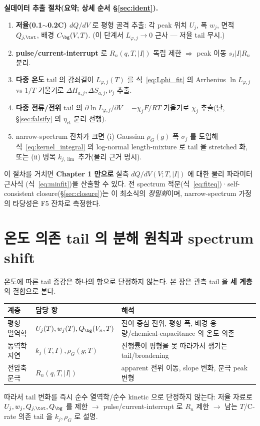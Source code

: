 \textbf{실데이터 추출 절차(요약; 상세 순서 \S\ref{sec:ident}).}
\begin{enumerate}[label=\textbf{F\arabic*.},leftmargin=2.4em]
\item \textbf{저율(0.1$\sim$0.2C) $dQ/dV$} 로 평형 골격 추출: 각 peak 위치 $U_j$, 폭 $w_j$, 면적
  $Q_{j,\tot}$, 배경 $C_\bg(V,T)$. (이 단계서 $L_{\varphi,j}\!\to\!0$ 근사 — 저율 tail 무시.)
\item \textbf{pulse/current-interrupt} 로 $R_n(q,T,|I|)$ 독립 제한 $\Rightarrow$ peak 이동
  $s_I|I|R_n$ 분리.
\item \textbf{다중 온도} tail 의 감쇠길이 $L_{\varphi,j}(T)$ 를 식~\eqref{eq:Lphi_fit} 의 Arrhenius
  $\ln L_{\varphi,j}$ vs $1/T$ 기울기로 $\Delta H_{a,j},\Delta S_{a,j},\nu_j$ 추출.
\item \textbf{다중 전류/전위} tail 의 $\partial\ln L_{\varphi,j}/\partial V=-\chi_j F/RT$ 기울기로 $\chi_j$
  추출(단, \S\ref{sec:falsify} 의 $\eta_\mathrm{ct}$ 분리 선행).
\item narrow-spectrum 잔차가 크면 (i) Gaussian $\rho_G(g)$ 폭 $\sigma_j$ 를 도입해 식~\eqref{eq:kernel_integral}
  의 log-normal length-mixture 로 tail 을 stretched 화, 또는 (ii) 병목 $k_{j,\lim}$ 추가(물리 근거 명시).
\end{enumerate}
이 절차를 거치면 \textbf{Chapter 1 만으로} 실측 $dQ/dV(V;T,|I|)$ 에 대한 물리 파라미터 근사식
(식~\eqref{eq:minfit})을 산출할 수 있다. 전 spectrum 적분(식~\eqref{eq:fiteq})·self-consistent
closure(\S\ref{sec:closure})는 이 최소식의 \emph{정밀화}이며, narrow-spectrum 가정의 타당성은 F5 잔차로 측정한다.

\section{온도 의존 tail 의 분해 원칙과 spectrum shift}\label{sec:tailT}
온도에 따른 tail 증감은 하나의 항으로 단정하지 않는다. 본 장은 관측 tail 을 \textbf{세 계층}의 결합으로 본다.
\begin{longtable}{p{} p{} p{}}
\toprule 계층 & 담당 항 & 해석 \\ \midrule \endhead
평형 열역학 & $U_j(T),w_j(T),Q_\bg(V_n,T)$ & 전이 중심 전위, 평형 폭, 배경 용량/chemical-capacitance 의 온도 의존 \\
동역학 지연 & $k_j(T,I),\rho_G(g;T)$ & 진행률이 평형을 못 따라가서 생기는 tail/broadening \\
전압축 분극 & $R_n(q,T,|I|)$ & apparent 전위 이동, slope 변화, 분극 peak 변형 \\
\bottomrule
\end{longtable}
따라서 tail 변화를 즉시 순수 열역학/순수 kinetic 으로 단정하지 않는다: 저율 자료로 $U_j,w_j,Q_{j,\tot},Q_\bg$
를 제한 $\to$ pulse/current-interrupt 로 $R_n$ 제한 $\to$ 남는 $T$/C-rate 의존 tail 을 $k_j,\rho_G$ 로 설명.

